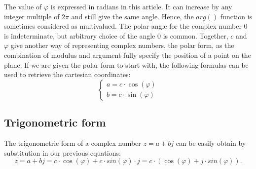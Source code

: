 \documentclass[12pt,oneside,openany]{memoir}
\numberwithin{equation}{subsection}
\begin{document}
The value of \(\varphi\) is expressed in radians in this article. It can
increase by any integer multiple of \(2\pi\) and still give the same angle.
Hence, the \(arg()\) function is sometimes considered as multivalued. The polar
angle for the complex number 0 is indeterminate, but arbitrary choice of the
angle 0 is common. Together, \(c\) and \(\varphi\) give another way of
representing complex numbers, the polar form, as the combination of modulus and
argument fully specify the position of a point on the plane.
\bigbreak
If we are given the polar form to start with, the following formulas can be used
to retrieve the cartesian coordinates:
\[
	\begin{cases}
		a = c \cdot \cos(\varphi)\\
		b = c \cdot \sin(\varphi)
	\end{cases}
\]


\subsection{Trigonometric form}
The trigonometric form of a complex number \(z = a + bj\) can be easily obtain
by substitution in our previous equations:
\[
	z = a + bj = c \cdot \cos(\varphi) + c \cdot sin(\varphi) \cdot j =
	c \cdot (\cos(\varphi) + j \cdot sin(\varphi)).
\]

\end{document}
